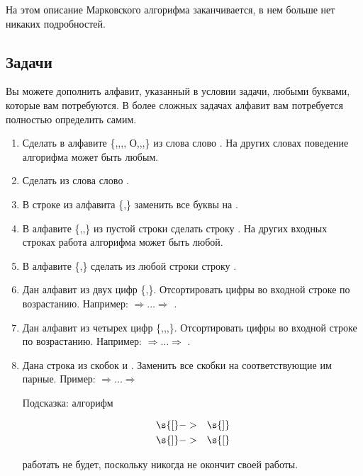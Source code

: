 На этом описание Марковского алгорифма заканчивается, в нем больше нет
никаких подробностей. 

\subsection{Задачи}

Вы можете дополнить алфавит, указанный в условии задачи, любыми буквами, 
которые вам потребуются. В более сложных задачах алфавит вам потребуется 
полностью определить самим. 

\begin{enumerate}
\item Сделать в алфавите 
\{,,,,\s
{О},,,\} из слова  слово .
На других словах поведение алгорифма может быть любым.

\item Сделать из слова  слово .

\item В строке из алфавита \{,\} заменить все буквы  на .

\item В алфавите \{,,\} из пустой строки сделать 
строку . На других
входных строках работа алгорифма может быть любой.

\item В алфавите \{,\} сделать из любой строки строку 
.

\item Дан алфавит из двух цифр \{,\}. Отсортировать 
цифры во входной строке по возрастанию. Например:  
$\Rightarrow\dots\Rightarrow$ .

\item Дан алфавит из четырех цифр \{,,,\}. 
Отсортировать цифры во входной строке по возрастанию. Например: 
 $\Rightarrow\dots\Rightarrow$ .

\item Дана строка из скобок \s{[} и \s{]}. Заменить все скобки на соответствующие
им парные. Пример: \s{[[][[[[} $\Rightarrow\dots\Rightarrow$ \s{]][]]]]}

Подсказка: алгорифм
\begin{bnf}\begin{eqnarray*}
\s{[}&->&\s{]}\\
\s{]}&->&\s{[}
\end{eqnarray*}\end{bnf}работать не будет, 
поскольку никогда не окончит своей работы.


\end{enumerate}
